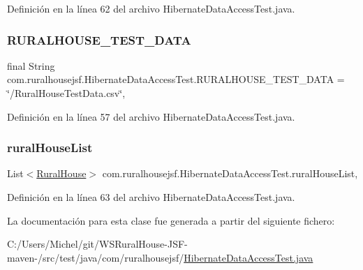 Definición en la línea 62 del archivo Hibernate\+Data\+Access\+Test.\+java.

\mbox{\label{classcom_1_1ruralhousejsf_1_1_hibernate_data_access_test_a9f9d6116edd1cdeb60cf726a921d148f}} 
\subsubsection{\texorpdfstring{RURALHOUSE\_TEST\_DATA}{RURALHOUSE\_TEST\_DATA}}
{\footnotesize\ttfamily final String com.\+ruralhousejsf.\+Hibernate\+Data\+Access\+Test.\+R\+U\+R\+A\+L\+H\+O\+U\+S\+E\+\_\+\+T\+E\+S\+T\+\_\+\+D\+A\+TA = \char`\"{}/Rural\+House\+Test\+Data.\+csv\char`\"{}\hspace{0.3cm}{\ttfamily [static]}, {\ttfamily [package]}}



Definición en la línea 57 del archivo Hibernate\+Data\+Access\+Test.\+java.

\mbox{\label{classcom_1_1ruralhousejsf_1_1_hibernate_data_access_test_a989d035f20b8a64527db2fbbd411943e}} 
\subsubsection{\texorpdfstring{ruralHouseList}{ruralHouseList}}
{\footnotesize\ttfamily List$<$\mbox{\hyperlink{classcom_1_1ruralhousejsf_1_1domain_1_1_rural_house}{Rural\+House}}$>$ com.\+ruralhousejsf.\+Hibernate\+Data\+Access\+Test.\+rural\+House\+List\hspace{0.3cm}{\ttfamily [static]}, {\ttfamily [package]}}



Definición en la línea 63 del archivo Hibernate\+Data\+Access\+Test.\+java.



La documentación para esta clase fue generada a partir del siguiente fichero\+:\begin{DoxyCompactItemize}
\item 
C\+:/\+Users/\+Michel/git/\+W\+S\+Rural\+House-\/\+J\+S\+F-\/maven-\//src/test/java/com/ruralhousejsf/\mbox{\hyperlink{_hibernate_data_access_test_8java}{Hibernate\+Data\+Access\+Test.\+java}}\end{DoxyCompactItemize}
